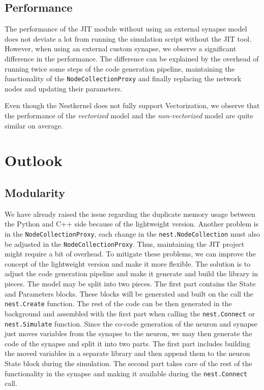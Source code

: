 \subsection*{Performance}

The performance of the JIT module without using an external synapse model does not deviate a lot from running the simulation script without the JIT tool. However, when using an external custom synapse, we observe a significant difference in the performance. The difference can be explained by the overhead of running twice some steps of the code generation pipeline, maintaining the functionality of the \texttt{NodeCollectionProxy} and finally replacing the network nodes and updating their parameters.

Even though the Nestkernel does not fully support Vectorization, we observe that the performance of the \emph{vectorized} model and the \emph{non-vectorized} model are quite similar on average.

\section{Outlook}

\subsection*{Modularity}

We have already raised the issue regarding the duplicate memory usage between the Python and C++ side because of the lightweight version. Another problem is in the \texttt{NodeCollectionProxy}, each change in the \texttt{nest.NodeCollection} must also be adjusted in the \texttt{NodeCollectionProxy}. Thus, maintaining the JIT project might require a bit of overhead. To mitigate these problems, we can improve the concept of the lightweight version and make it more flexible. The solution is to adjust the code generation pipeline and make it generate and build the library in pieces. The model may be split into two pieces. The first part contains the State and Parameters blocks. These blocks will be generated and built on the call the \texttt{nest.Create} function. The rest of the code can be then generated in the background and assembled with the first part when calling the \texttt{nest.Connect} or \texttt{nest.Simulate} function. Since the co-code generation of the neuron and synapse just moves variables from the synapse to the neuron, we may then generate the code of the synapse and split it into two parts. The first part includes building the moved variables in a separate library and then append them to the neuron State block during the simulation. The second part takes care of the rest of the functionality in the synapse and making it available during the \texttt{nest.Connect} call.

